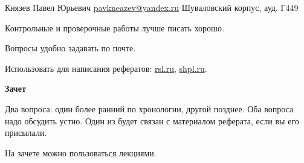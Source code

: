 \documentclass[a4paper, 12pt]{article}
\begin{document}
\begin{titlepage}
\centering
\noindent
{Князев Павел Юрьевич} \hfill
{\href{mailto:pavkneazev@yandex.ru}{pavkneazev@yandex.ru}} 
\newline 
\hspace*{0pt}\hfill Шуваловский корпус, ауд. Г449


\vfill

Контрольные и проверочные работы лучше писать хорошо. 

Вопросы удобно задавать по почте. 

Использовать для написания рефератов: \href{https://www.rsl.ru}{rsl.ru}, \href{https://www.shpl.ru}{shpl.ru}.

\vfill

\textbf{Зачет}

\parbox[t]{.7\linewidth}{
Два вопроса: один более ранний по хронологии, другой позднее. Оба вопроса надо обсудить устно. Один из будет связан с материалом реферата, если вы его присылали. 

На зачете можно пользоваться лекциями.
}

\vfill
\vfill
\vfill

\end{titlepage}

\clearpage
\tableofcontents
\clearpage
\end{document}
